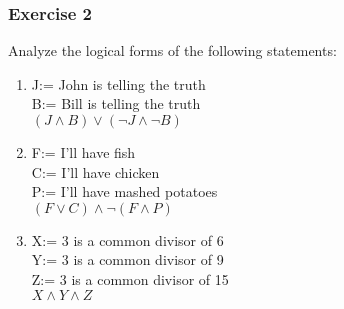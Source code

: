 \begin{questions}

\subsubsection{Exercise 2}
\question Analyze the logical forms of the following statements:


\begin{solution}
    \begin{enumerate}[label=(\alph*)]
        \item J:= John is telling the truth \\
        B:= Bill is telling the truth \\
        $(J \wedge B) \vee (\neg J \wedge \neg B)$
        
        \item F:= I'll have fish \\
        C:= I'll have chicken \\
        P:= I'll have mashed potatoes \\
        $(F \vee C) \wedge \neg(F \wedge P)$
        
        \item X:= 3 is a common divisor of 6\\
        Y:= 3 is a common divisor of 9\\
        Z:= 3 is a common divisor of 15\\
        $X \wedge Y \wedge Z$
    \end{enumerate}
\end{solution}




\end{questions}
